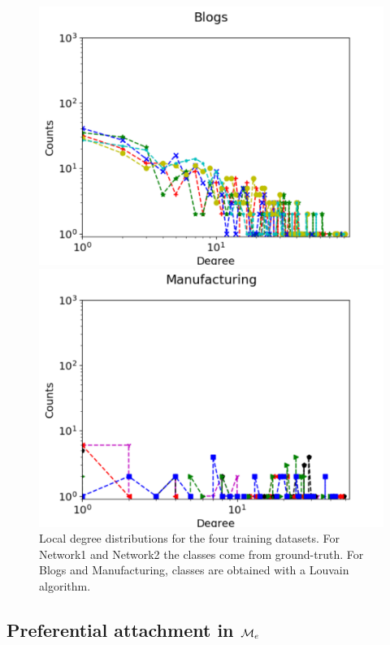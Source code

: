 \begin{figure}[h]
\begin{minipage}{0.45\textwidth}
            \includegraphics[width=\textwidth]{img/corpus/blogs_1}
        \end{minipage}
        \begin{minipage}{0.45\textwidth}
            \includegraphics[width=\textwidth]{img/corpus/manufacturing_1}
        \end{minipage}
        \caption {Local degree distributions for the four training datasets. For Network1 and Network2 the classes come from ground-truth. For Blogs and Manufacturing, classes are obtained with a Louvain algorithm.} 
	\label{fig:synt_graph_local}
\end{figure}



\subsection{Preferential attachment in $\mathcal{M}_e$}

